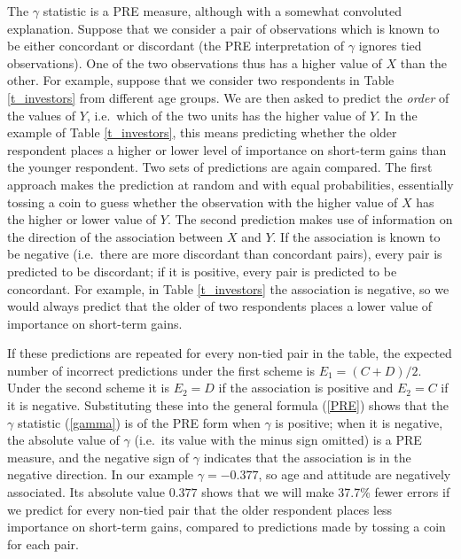 The $\gamma$ statistic is a PRE measure, although with a somewhat
convoluted explanation. Suppose that we
consider a pair of observations which is known to be either concordant
or discordant (the PRE interpretation of $\gamma$ ignores tied
observations). One of the two observations thus has a higher value
of $X$ than the other. For example, suppose that we consider two
respondents in Table \ref{t_investors} from different age groups. We
are then asked to predict the \emph{order} of the values of $Y$, i.e.\
which of the two units has the higher value of $Y$. In the example of
Table \ref{t_investors}, this means predicting whether the older
respondent places a higher or lower level of importance on short-term
gains than the younger respondent. Two sets of predictions are again
compared. The first approach makes the prediction at random and with
equal probabilities, essentially tossing a coin to guess whether the
observation with the higher value of $X$ has the higher or lower value
of $Y$. The second prediction makes use of information on the direction
of the association between $X$ and $Y$. If the association is known to
be negative (i.e.\ there are more discordant than concordant pairs),
every pair is predicted to be discordant; if it is positive, every pair
is predicted to be concordant. For example, in Table \ref{t_investors}
the association is negative, so we would always predict that the older
of two respondents places a lower value of importance on short-term
gains.

If these predictions are repeated for every non-tied pair in the table,
the expected number of incorrect predictions under the first scheme is
$E_{1}=(C+D)/2$. Under the second scheme it is $E_{2}=D$ if the
association is positive and $E_{2}=C$ if it is negative. Substituting
these into the general formula (\ref{PRE}) shows that the $\gamma$
statistic (\ref{gamma}) is of the PRE form when $\gamma$ is positive;
when it is negative, the absolute value of $\gamma$ (i.e.\ its value
with the minus sign omitted) is a PRE measure, and the negative sign of
$\gamma$ indicates that the association is in the negative direction. In
our example $\gamma=-0.377$, so age and attitude are negatively
associated. Its absolute value $0.377$ shows that we will make
37.7\% fewer errors if we predict for every non-tied pair that the older
respondent places less importance on short-term gains, compared to
predictions made by tossing a coin for each pair.

